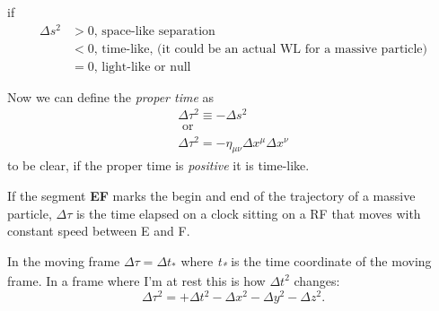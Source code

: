 if 
\begin{align*}
	\Delta s^{2} & > 0 \text{, space-like separation} \\
		     &< 0 \text{, time-like, (it could be an actual WL for a massive particle)} \\
		     &= 0  \text{, light-like or null}
\end{align*}

Now we can define the \emph{proper time} as
\begin{gather*}
	\Delta \tau^{2} \equiv - \Delta s^{2}\\
	 \text{ or }\\
	 \Delta \tau^{2} = - \eta_{\mu  \nu }\Delta x^{\mu } \Delta x^{\nu }
\end{gather*}
to be clear, if the proper time is \emph{positive} it is time-like.

If the segment \textbf{EF} marks the begin and end of the trajectory of a massive particle, $\Delta  \tau $ is the time elapsed on a clock sitting on a RF that moves with constant speed between E and F.\par

In the moving frame $\Delta \tau = \Delta t_{*}$ where \emph{t\textsubscript{*}} is the time coordinate of the moving frame. 
In a frame where I'm at rest this is how $\Delta t^{2}$ changes:
\begin{equation}
\Delta  \tau^{2} = + \Delta t^{2} - \Delta x^{2} - \Delta y^{2}- \Delta z^{2}.
\end{equation}
